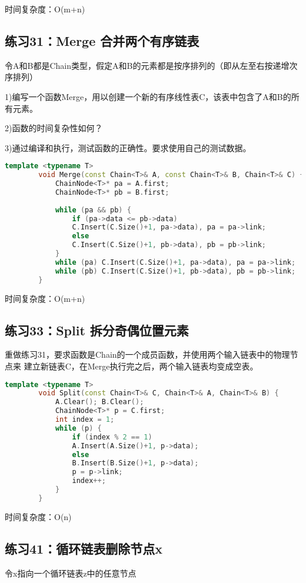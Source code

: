\documentclass[UTF8]{ctexart}
\begin{document}
	 时间复杂度：O(m+n)
	
	
	
	\subsection*{练习31：Merge 合并两个有序链表}
	令A和B都是Chain类型，假定A和B的元素都是按序排列的（即从左至右按递增次
	序排列）
	
	1)编写一个函数Merge，用以创建一个新的有序线性表C，该表中包含了A和B的所有元素。
	
	2)函数的时间复杂性如何？
	
	3)通过编译和执行，测试函数的正确性。要求使用自己的测试数据。
	
	\begin{lstlisting}[language=C++]
		template <typename T>
		void Merge(const Chain<T>& A, const Chain<T>& B, Chain<T>& C) {
			ChainNode<T>* pa = A.first;
			ChainNode<T>* pb = B.first;
			
			while (pa && pb) {
				if (pa->data <= pb->data)
				C.Insert(C.Size()+1, pa->data), pa = pa->link;
				else
				C.Insert(C.Size()+1, pb->data), pb = pb->link;
			}
			while (pa) C.Insert(C.Size()+1, pa->data), pa = pa->link;
			while (pb) C.Insert(C.Size()+1, pb->data), pb = pb->link;
		}
	\end{lstlisting}
	
	 时间复杂度：O(m+n)
	
	
	
	\subsection*{练习33：Split 拆分奇偶位置元素}
	重做练习31，要求函数是Chain的一个成员函数，并使用两个输入链表中的物理节点来
	建立新链表C，在Merge执行完之后，两个输入链表均变成空表。
	
	\begin{lstlisting}[language=C++]
		template <typename T>
		void Split(const Chain<T>& C, Chain<T>& A, Chain<T>& B) {
			A.Clear(); B.Clear();
			ChainNode<T>* p = C.first;
			int index = 1;
			while (p) {
				if (index % 2 == 1)
				A.Insert(A.Size()+1, p->data);
				else
				B.Insert(B.Size()+1, p->data);
				p = p->link;
				index++;
			}
		}
	\end{lstlisting}
	
	 时间复杂度：O(n)
	
	
	
	\subsection*{练习41：循环链表删除节点x}
	令x指向一个循环链表z中的任意节点
	
\end{document}

